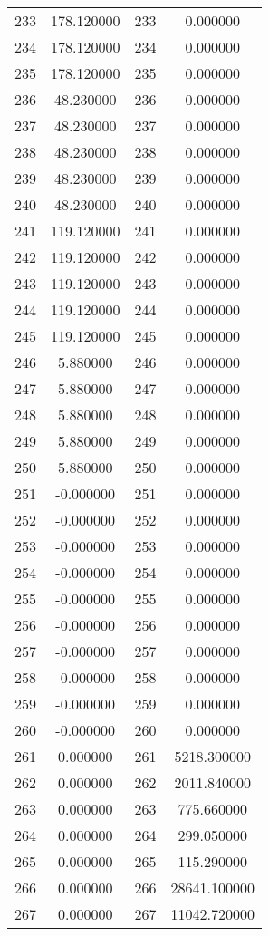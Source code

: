 \documentclass[12pt]{article}
\begin{document}
\begin{longtable}{@{}cccc@{}}
233 & 178.120000 & 233 & 0.000000 \\
234 & 178.120000 & 234 & 0.000000 \\
235 & 178.120000 & 235 & 0.000000 \\
236 & 48.230000 & 236 & 0.000000 \\
237 & 48.230000 & 237 & 0.000000 \\
238 & 48.230000 & 238 & 0.000000 \\
239 & 48.230000 & 239 & 0.000000 \\
240 & 48.230000 & 240 & 0.000000 \\
241 & 119.120000 & 241 & 0.000000 \\
242 & 119.120000 & 242 & 0.000000 \\
243 & 119.120000 & 243 & 0.000000 \\
244 & 119.120000 & 244 & 0.000000 \\
245 & 119.120000 & 245 & 0.000000 \\
246 & 5.880000 & 246 & 0.000000 \\
247 & 5.880000 & 247 & 0.000000 \\
248 & 5.880000 & 248 & 0.000000 \\
249 & 5.880000 & 249 & 0.000000 \\
250 & 5.880000 & 250 & 0.000000 \\
251 & -0.000000 & 251 & 0.000000 \\
252 & -0.000000 & 252 & 0.000000 \\
253 & -0.000000 & 253 & 0.000000 \\
254 & -0.000000 & 254 & 0.000000 \\
255 & -0.000000 & 255 & 0.000000 \\
256 & -0.000000 & 256 & 0.000000 \\
257 & -0.000000 & 257 & 0.000000 \\
258 & -0.000000 & 258 & 0.000000 \\
259 & -0.000000 & 259 & 0.000000 \\
260 & -0.000000 & 260 & 0.000000 \\
261 & 0.000000 & 261 & 5218.300000 \\
262 & 0.000000 & 262 & 2011.840000 \\
263 & 0.000000 & 263 & 775.660000 \\
264 & 0.000000 & 264 & 299.050000 \\
265 & 0.000000 & 265 & 115.290000 \\
266 & 0.000000 & 266 & 28641.100000 \\
267 & 0.000000 & 267 & 11042.720000 \\

\end{longtable}
\end{document}
